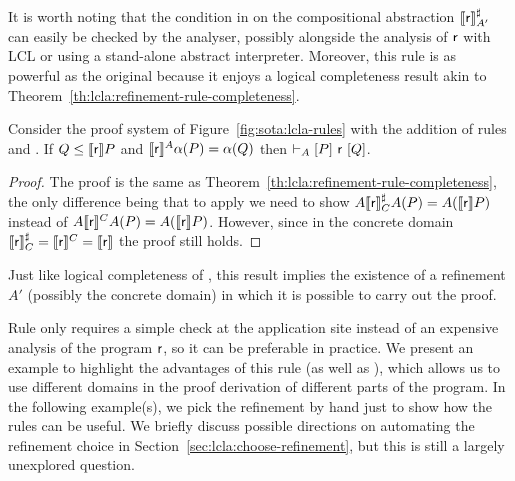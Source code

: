 It is worth noting that the condition in  on the compositional abstraction $\llbracket\mathsf{r}\rrbracket^{\sharp}_{A'}$ can easily be checked by the analyser, possibly alongside the analysis of $\mathsf{r}$ with LCL or using a stand-alone abstract interpreter.
Moreover, this rule is as powerful as the original  because it enjoys a logical completeness result akin to Theorem~\ref{th:lcla:refinement-rule-completeness}.
\begin{theorem}\label{th:lcla:refine-int-completeness}
	Consider the proof system of Figure~\ref{fig:sota:lcla-rules} with the addition of rules  and . If $Q \le \llbracket\mathsf{r}\rrbracket P$ and $\llbracket\mathsf{r}\rrbracket^A \alpha(P) = \alpha(Q)$ then $\vdash_{A}\nobreak[P]~\mathsf{r}~[Q]$.
\end{theorem}
\begin{proof}
	The proof is the same as Theorem~\ref{th:lcla:refinement-rule-completeness}, the only difference being that to apply  we need to show $A \llbracket\mathsf{r}\rrbracket^{\sharp}_{C} A(P) = A(\llbracket\mathsf{r}\rrbracket P)$ instead of $A \llbracket\mathsf{r}\rrbracket^{C} A(P) = A(\llbracket\mathsf{r}\rrbracket P)$. However, since in the concrete domain $\llbracket\mathsf{r}\rrbracket^{\sharp}_{C} = \llbracket\mathsf{r}\rrbracket^{C} = \llbracket\mathsf{r}\rrbracket$ the proof still holds.
\end{proof}

Just like logical completeness of , this result implies the existence of a refinement $A'$ (possibly the concrete domain) in which it is possible to carry out the proof.

Rule  only requires a simple check at the application site instead of an expensive analysis of the program $\mathsf{r}$, so it can be preferable in practice.
We present an example to highlight the advantages of this rule (as well as ), which allows us to use different domains in the proof derivation of different parts of the program.
In the following example(s), we pick the refinement by hand just to show how the rules can be useful. We briefly discuss possible directions on automating the refinement choice in Section~\ref{sec:lcla:choose-refinement}, but this is still a largely unexplored question.

